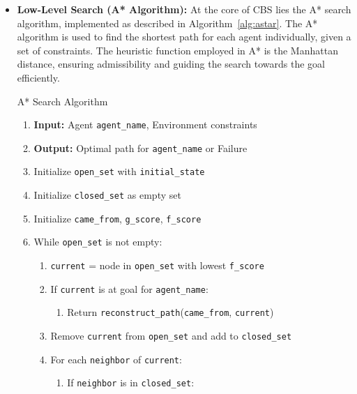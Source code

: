 \begin{itemize}
    \item \textbf{Low-Level Search (A* Algorithm):} At the core of CBS lies the A* search algorithm, implemented as described in Algorithm~\ref{alg:astar}. The A* algorithm is used to find the shortest path for each agent individually, given a set of constraints. The heuristic function employed in A* is the Manhattan distance, ensuring admissibility and guiding the search towards the goal efficiently.

    \begin{algorithm}
    \caption{A* Search Algorithm}
    \label{alg:astar}
    \begin{enumerate}
        \item \textbf{Input:} Agent \texttt{agent\_name}, Environment constraints
        \item \textbf{Output:} Optimal path for \texttt{agent\_name} or Failure
        \item Initialize \texttt{open\_set} with \texttt{initial\_state}
        \item Initialize \texttt{closed\_set} as empty set
        \item Initialize \texttt{came\_from}, \texttt{g\_score}, \texttt{f\_score}
        \item While \texttt{open\_set} is not empty:
            \begin{enumerate}
                \item \texttt{current} = node in \texttt{open\_set} with lowest \texttt{f\_score}
                \item If \texttt{current} is at goal for \texttt{agent\_name}:
                    \begin{enumerate}
                        \item Return \texttt{reconstruct\_path}(\texttt{came\_from}, \texttt{current})
                    \end{enumerate}
                \item Remove \texttt{current} from \texttt{open\_set} and add to \texttt{closed\_set}
                \item For each \texttt{neighbor} of \texttt{current}:
                    \begin{enumerate}
                        \item If \texttt{neighbor} is in \texttt{closed\_set}:
                            \begin{enumerate}

\end{enumerate}
\end{enumerate}
\end{enumerate}
\end{enumerate}
\end{algorithm}
\end{itemize}
